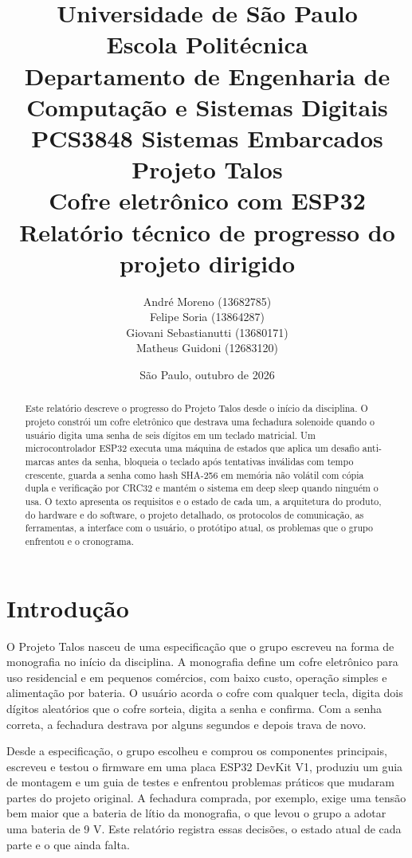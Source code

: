 \documentclass[11pt,a4paper]{article}
\title{\vspace{-1cm}\normalsize Universidade de São Paulo\\Escola Politécnica\\Departamento de Engenharia de Computação e Sistemas Digitais\\[4pt]PCS3848 Sistemas Embarcados\\[2.2cm]
\LARGE Projeto Talos\\[4pt]\large Cofre eletrônico com ESP32\\[6pt]\normalsize Relatório técnico de progresso do projeto dirigido\\[2cm]}
\author{André Moreno (13682785)\\Felipe Soria (13864287)\\Giovani Sebastianutti (13680171)\\Matheus Guidoni (12683120)}
\date{São Paulo, outubro de 2026}
\begin{document}
\begin{titlepage}
\maketitle
\thispagestyle{empty}
\end{titlepage}

\begin{abstract}
Este relatório descreve o progresso do Projeto Talos desde o início da disciplina. O projeto constrói um cofre eletrônico que destrava uma fechadura solenoide quando o usuário digita uma senha de seis dígitos em um teclado matricial. Um microcontrolador ESP32 executa uma máquina de estados que aplica um desafio anti-marcas antes da senha, bloqueia o teclado após tentativas inválidas com tempo crescente, guarda a senha como hash SHA-256 em memória não volátil com cópia dupla e verificação por CRC32 e mantém o sistema em deep sleep quando ninguém o usa. O texto apresenta os requisitos e o estado de cada um, a arquitetura do produto, do hardware e do software, o projeto detalhado, os protocolos de comunicação, as ferramentas, a interface com o usuário, o protótipo atual, os problemas que o grupo enfrentou e o cronograma.
\end{abstract}

\tableofcontents
\newpage

\section{Introdução}

O Projeto Talos nasceu de uma especificação que o grupo escreveu na forma de monografia no início da disciplina. A monografia define um cofre eletrônico para uso residencial e em pequenos comércios, com baixo custo, operação simples e alimentação por bateria. O usuário acorda o cofre com qualquer tecla, digita dois dígitos aleatórios que o cofre sorteia, digita a senha e confirma. Com a senha correta, a fechadura destrava por alguns segundos e depois trava de novo.

Desde a especificação, o grupo escolheu e comprou os componentes principais, escreveu e testou o firmware em uma placa ESP32 DevKit V1, produziu um guia de montagem e um guia de testes e enfrentou problemas práticos que mudaram partes do projeto original. A fechadura comprada, por exemplo, exige uma tensão bem maior que a bateria de lítio da monografia, o que levou o grupo a adotar uma bateria de 9 V. Este relatório registra essas decisões, o estado atual de cada parte e o que ainda falta.
\end{document}
